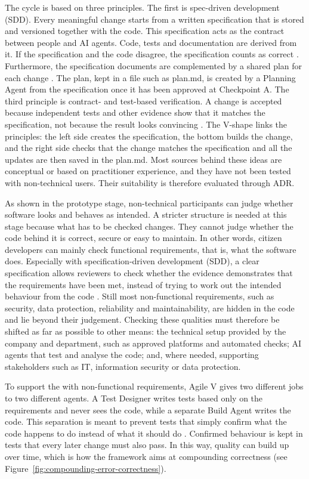 \documentclass[10pt,a4paper]{article}
\begin{document}
The cycle is based on three principles. The first is spec-driven development (SDD). Every meaningful change starts from a written specification that is stored and versioned together with the code. This specification acts as the contract between people and AI agents. Code, tests and documentation are derived from it. If the specification and the code disagree, the specification counts as correct \parencite{diaz2026}. Furthermore, the specification documents are complemented by a shared plan for each change \parencite{lopopolo2026HarnessEngineering}. The plan, kept in a file such as plan.md, is created by a Planning Agent from the specification once it has been approved at Checkpoint A. The third principle is contract- and test-based verification. A change is accepted because independent tests and other evidence show that it matches the specification, not because the result looks convincing \parencite{koch2026agentic}. The V-shape links the principles: the left side creates the specification, the bottom builds the change, and the right side checks that the change matches the specification and all the updates are then saved in the plan.md. Most sources behind these ideas are conceptual or based on practitioner experience, and they have not been tested with non-technical users. Their suitability is therefore evaluated through ADR.

As shown in the prototype stage, non-technical participants can judge whether software looks and behaves as intended. A stricter structure is needed at this stage because what has to be checked changes. They cannot judge whether the code behind it is correct, secure or easy to maintain. In other words, citizen developers can mainly check functional requirements, that is, what the software does. Especially with specification-driven development (SDD), a clear specification allows reviewers to check whether the evidence demonstrates that the requirements have been met, instead of trying to work out the intended behaviour from the code \parencite{diaz2026}. Still most non-functional requirements, such as security, data protection, reliability and maintainability, are hidden in the code and lie beyond their judgement. Checking these qualities must therefore be shifted as far as possible to other means: the technical setup provided by the company and department, such as approved platforms and automated checks; AI agents that test and analyse the code; and, where needed, supporting stakeholders such as IT, information security or data protection.

To support the with non-functional requirements, Agile V gives two different jobs to two different agents. A Test Designer writes tests based only on the requirements and never sees the code, while a separate Build Agent writes the code. This separation is meant to prevent tests that simply confirm what the code happens to do instead of what it should do \parencite{koch2026agile}. Confirmed behaviour is kept in tests that every later change must also pass. In this way, quality can build up over time, which is how the framework aims at compounding correctness (see Figure~\ref{fig:compounding-error-correctness}).
\end{document}

